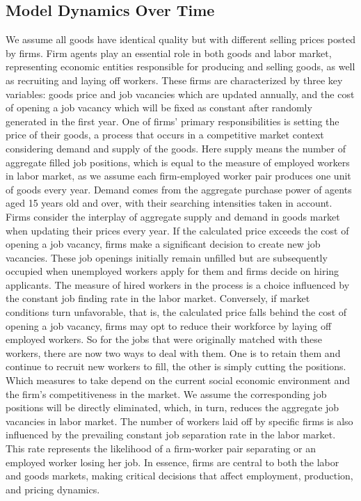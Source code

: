 \documentclass[ %
    final,
    scrbook,
    listoffigures,
    listoftables, 
    glossary]{cu-thesis}
\begin{document}
\subsection{Model Dynamics Over Time}
We assume all goods have identical quality but with different selling prices posted by firms.  Firm agents play an essential role in both goods and labor market, representing economic entities responsible for producing and selling goods, as well as recruiting and laying off workers. These firms are characterized by three key variables: goods price and job vacancies which are updated annually, and the cost of opening a job vacancy which will be fixed as constant after randomly generated in the first year. One of firms' primary responsibilities is setting the price of their goods, a process that occurs in a competitive market context considering demand and supply of the goods. Here supply means the number of aggregate filled job positions, which is equal to the measure of employed workers in labor market, as we assume each firm-employed worker pair produces one unit of goods every year. Demand comes from the aggregate purchase power of agents aged 15 years old and over, with their searching intensities taken in account. Firms consider the interplay of aggregate supply and demand in goods market when updating their prices every year. If the calculated price exceeds the cost of opening a job vacancy, firms make a significant decision to create new job vacancies. These job openings initially remain unfilled but are subsequently occupied when unemployed workers apply for them and firms decide on hiring applicants. The measure of hired workers in the process is a choice influenced by the constant job finding rate in the labor market. Conversely, if market conditions turn unfavorable, that is, the calculated price falls behind the cost of opening a job vacancy, firms may opt to reduce their workforce by laying off employed workers. So for the jobs that were originally matched with these workers, there are now two ways to deal with them. One is to retain them and continue to recruit new workers to fill, the other is simply cutting the positions. Which measures to take depend on the current social economic environment and the firm's competitiveness in the market. We assume the corresponding job positions will be directly eliminated, which, in turn, reduces the aggregate job vacancies in labor market. The number of workers laid off by specific firms is also influenced by the prevailing constant job separation rate in the labor market. This rate represents the likelihood of a firm-worker pair separating or an employed worker losing her job. In essence, firms are central to both the labor and goods markets, making critical decisions that affect employment, production, and pricing dynamics.
\fi
\end{document}
